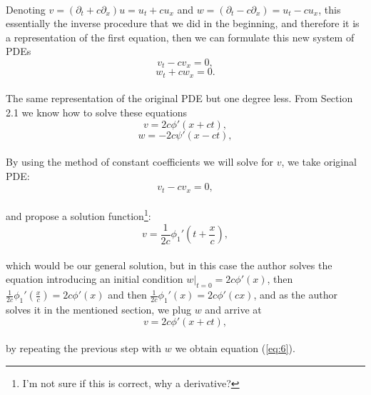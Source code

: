 \documentclass{article}
\begin{document}
\paragraph{}Denoting  $v = (\partial_t + c\partial_x)u = u_t + cu_x$ and $w = (\partial_t - c\partial_x) = u_t - cu_x$, this essentially the inverse procedure that we did in the beginning, and therefore it is a representation of the first equation, then we can formulate this new system of PDEs
\begin{equation}
v_t - cv_x = 0,\label{eq:3}
\end{equation}
\begin{equation}
w_t + cw_x = 0.\label{eq:4}
\end{equation}
\paragraph{}The same representation of the original PDE but one degree less. From Section 2.1 we know how to solve these equations
\begin{equation}
v = 2c\phi'(x + ct)\label{eq:5},
\end{equation}
\begin{equation}
w = -2c\psi'(x - ct)\label{eq:6},
\end{equation}
\paragraph{}By using the method of constant coefficients we will solve for $v$, we take original PDE:
$$v_t - c v_x = 0,$$
\paragraph{}and propose a solution function\footnote{I'm not sure if this is correct, why a derivative?}:
$$v = \frac{1}{2c}\phi_1'\left(t + \frac{x}{c}\right),$$
\paragraph{}which would be our general solution, but in this case the author solves the equation introducing an initial condition $w|_{t=0} = 2c\phi'(x)$, then  $\frac{1}{2c}\phi_1'(\frac{x}{c}) = 2c\phi'(x)$ and then $\frac{1}{2c}\phi_1'(x) = 2c\phi'(cx)$, and as the author solves it in the mentioned section, we plug $w$ and arrive at
$$v = 2c\phi'(x + ct),$$
\paragraph{} by repeating the  previous step with $w$ we obtain equation (\ref{eq:6}).
\end{document}
